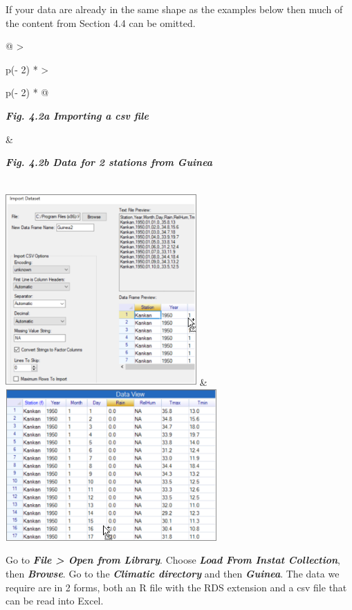 \documentclass[
  letterpaper,
  DIV=11,
  numbers=noendperiod]{scrreprt}
\begin{document}
If your data are already in the same shape as the examples below then
much of the content from Section 4.4 can be omitted.

\begin{longtable}[]{@{}
  >{\raggedright\arraybackslash}p{(\columnwidth - 2\tabcolsep) * }
  >{\raggedright\arraybackslash}p{(\columnwidth - 2\tabcolsep) * }@{}}
\toprule\noalign{}
\begin{minipage}[b]{\linewidth}\raggedright
\textbf{\emph{Fig. 4.2a Importing a csv file}}
\end{minipage} & \begin{minipage}[b]{\linewidth}\raggedright
\textbf{\emph{Fig. 4.2b Data for 2 stations from Guinea}}
\end{minipage} \\
\midrule\noalign{}
\endhead
\bottomrule\noalign{}
\endlastfoot
\includegraphics[width=2.87481in,height=2.91749in]{figures/Fig4.2a.png}
&
\includegraphics[width=3.18946in,height=2.27875in]{figures/Fig4.2b.png} \\
\end{longtable}

Go to \textbf{\emph{File \textgreater{} Open from Library}}. Choose
\textbf{\emph{Load From Instat Collection}}, then
\textbf{\emph{Browse}}. Go to the \textbf{\emph{Climatic directory}} and
then \textbf{\emph{Guinea}}. The data we require are in 2 forms, both an
R file with the RDS extension and a csv file that can be read into
Excel.
\end{document}
